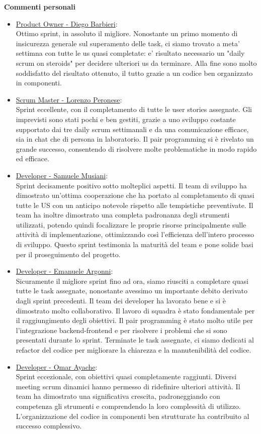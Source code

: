 \documentclass{article}
\begin{document}
\textbf{Commenti personali}
\begin{itemize}
    \item \underline{Product Owner - Diego Barbieri}: \\
    Ottimo sprint, in assoluto il migliore. Nonostante un primo momento di insicurezza generale sul superamento delle task, ci siamo trovato a meta' settimna con 
    tutte le us quasi completate: e' risultato necessario un "daily scrum on steroids" per decidere ulteriori us da terminare. Alla fine sono molto soddisfatto del 
    risultato ottenuto, il tutto grazie a un codice ben organizzato in componenti.
    \item \underline{Scrum Master - Lorenzo Peronese}: \\
    Sprint eccellente, con il completamento di tutte le user stories assegnate. Gli imprevisti sono stati pochi e ben gestiti, grazie a uno sviluppo costante 
    supportato dai tre daily scrum settimanali e da una comunicazione efficace, sia in chat che di persona in laboratorio. Il pair programming si è rivelato 
    un grande successo, consentendo di risolvere molte problematiche in modo rapido ed efficace.
    \item \underline{Developer - Samuele Musiani}: \\
    Sprint decisamente positivo sotto molteplici aspetti. Il team di sviluppo ha dimostrato un'ottima cooperazione che ha portato al completamento di quasi tutte le US 
    con un anticipo notevole rispetto alle tempistiche preventivate. Il team ha inoltre dimostrato una completa padronanza degli strumenti utilizzati, potendo quindi 
    focalizzare le proprie risorse principalmente sulle attività di implementazione, ottimizzando così l'efficienza dell'intero processo di sviluppo. Questo sprint 
    testimonia la maturità del team e pone solide basi per il proseguimento del progetto.
    \item \underline{Developer - Emanuele Argonni}: \\
    Sicuramente il migliore sprint fino ad ora, siamo riusciti a completare quasi tutte le task assegnate, nonostante avessimo un importante debito derivato 
    dagli sprint precedenti.
    Il team dei developer ha lavorato bene e si è dimostrato molto collaborativo. Il lavoro di squadra è stato fondamentale per il raggiungimento degli obiettivi.
    Il pair programming è stato molto utile per l'integrazione backend-frontend e per risolvere i problemi che si sono presentati durante lo sprint.
    Terminate le task assegnate, ci siamo dedicati al refactor del codice per migliorare la chiarezza e la manutenibilità del codice.
    \item \underline{Developer - Omar Ayache}:\\
    Sprint eccezionale, con obiettivi quasi completamente raggiunti. Diversi meeting scrum dinamici hanno permesso di ridefinire ulteriori attività. Il team ha dimostrato 
    una significativa crescita, padroneggiando con competenza gli strumenti e comprendendo la loro complessità di utilizzo. L'organizzazione del codice in componenti 
    ben strutturate ha contribuito al successo complessivo.    
\end{itemize} 
\end{document}
